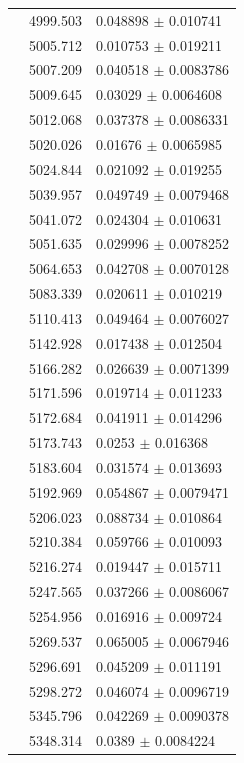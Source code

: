 \begin{longtable}{|c|c|l|}
 & 4999.503 & 0.048898 $\pm$ 0.010741 \\        
 & 5005.712 & 0.010753 $\pm$ 0.019211 \\        
 & 5007.209 & 0.040518 $\pm$ 0.0083786 \\       
 & 5009.645 & 0.03029 $\pm$ 0.0064608 \\        
 & 5012.068 & 0.037378 $\pm$ 0.0086331 \\       
 & 5020.026 & 0.01676 $\pm$ 0.0065985 \\        
 & 5024.844 & 0.021092 $\pm$ 0.019255 \\        
 & 5039.957 & 0.049749 $\pm$ 0.0079468 \\       
 & 5041.072 & 0.024304 $\pm$ 0.010631 \\        
 & 5051.635 & 0.029996 $\pm$ 0.0078252 \\       
 & 5064.653 & 0.042708 $\pm$ 0.0070128 \\       
 & 5083.339 & 0.020611 $\pm$ 0.010219 \\        
 & 5110.413 & 0.049464 $\pm$ 0.0076027 \\       
 & 5142.928 & 0.017438 $\pm$ 0.012504 \\        
 & 5166.282 & 0.026639 $\pm$ 0.0071399 \\       
 & 5171.596 & 0.019714 $\pm$ 0.011233 \\        
 & 5172.684 & 0.041911 $\pm$ 0.014296 \\        
 & 5173.743 & 0.0253 $\pm$ 0.016368 \\          
 & 5183.604 & 0.031574 $\pm$ 0.013693 \\        
 & 5192.969 & 0.054867 $\pm$ 0.0079471 \\       
 & 5206.023 & 0.088734 $\pm$ 0.010864 \\        
 & 5210.384 & 0.059766 $\pm$ 0.010093 \\        
 & 5216.274 & 0.019447 $\pm$ 0.015711 \\        
 & 5247.565 & 0.037266 $\pm$ 0.0086067 \\       
 & 5254.956 & 0.016916 $\pm$ 0.009724 \\        
 & 5269.537 & 0.065005 $\pm$ 0.0067946 \\       
 & 5296.691 & 0.045209 $\pm$ 0.011191 \\        
 & 5298.272 & 0.046074 $\pm$ 0.0096719 \\       
 & 5345.796 & 0.042269 $\pm$ 0.0090378 \\       
 & 5348.314 & 0.0389 $\pm$ 0.0084224 \\         

\end{longtable}
